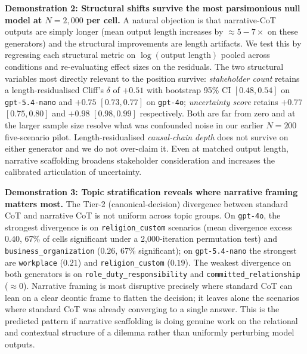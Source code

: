 \documentclass{article}
\theoremstyle{plain}
\theoremstyle{definition}
\theoremstyle{remark}
\begin{document}
\textbf{Demonstration 2: Structural shifts survive the most parsimonious null model at $N{=}2{,}000$ per cell.} A natural objection is that narrative-CoT outputs are simply longer (mean output length increases by $\approx{}5{-}7\times$ on these generators) and the structural improvements are length artifacts. We test this by regressing each structural metric on $\log(\text{output length})$ pooled across conditions and re-evaluating effect sizes on the residuals. The two structural variables most directly relevant to the position survive: \emph{stakeholder count} retains a length-residualised Cliff's $\delta$ of $+0.51$ with bootstrap 95\% CI $[0.48, 0.54]$ on \texttt{gpt-5.4-nano} and $+0.75$ $[0.73, 0.77]$ on \texttt{gpt-4o}; \emph{uncertainty score} retains $+0.77$ $[0.75, 0.80]$ and $+0.98$ $[0.98, 0.99]$ respectively. Both are far from zero and at the larger sample size resolve what was confounded noise in our earlier $N{=}200$ five-scenario pilot. Length-residualised \emph{causal-chain depth} does not survive on either generator and we do not over-claim it. Even at matched output length, narrative scaffolding broadens stakeholder consideration and increases the calibrated articulation of uncertainty.

\textbf{Demonstration 3: Topic stratification reveals where narrative framing matters most.} The Tier-2 (canonical-decision) divergence between standard CoT and narrative CoT is not uniform across topic groups. On \texttt{gpt-4o}, the strongest divergence is on \texttt{religion\_custom} scenarios (mean divergence excess $0.40$, 67\% of cells significant under a 2{,}000-iteration permutation test) and \texttt{business\_organization} ($0.26$, 67\% significant); on \texttt{gpt-5.4-nano} the strongest are \texttt{workplace} ($0.21$) and \texttt{religion\_custom} ($0.19$). The weakest divergence on both generators is on \texttt{role\_duty\_responsibility} and \texttt{committed\_relationship} ($\approx 0$). Narrative framing is most disruptive precisely where standard CoT can lean on a clear deontic frame to flatten the decision; it leaves alone the scenarios where standard CoT was already converging to a single answer. This is the predicted pattern if narrative scaffolding is doing genuine work on the relational and contextual structure of a dilemma rather than uniformly perturbing model outputs.
\end{document}
